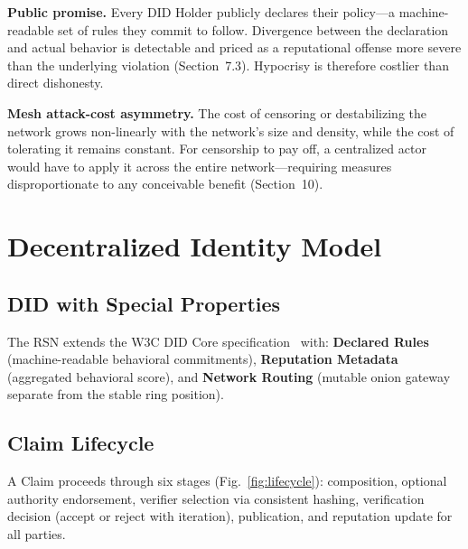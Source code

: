 \documentclass[11pt,a4paper,twocolumn]{article}
\begin{document}
\textbf{Public promise.} Every DID Holder publicly declares their policy---a machine-readable set of rules they commit to follow. Divergence between the declaration and actual behavior is detectable and priced as a reputational offense more severe than the underlying violation (Section~7.3). Hypocrisy is therefore costlier than direct dishonesty.

\textbf{Mesh attack-cost asymmetry.} The cost of censoring or destabilizing the network grows non-linearly with the network's size and density, while the cost of tolerating it remains constant. For censorship to pay off, a centralized actor would have to apply it across the entire network---requiring measures disproportionate to any conceivable benefit (Section~10).

\section{Decentralized Identity Model}

\subsection{DID with Special Properties}

The RSN extends the W3C DID Core specification~\cite{did2022} with: \textbf{Declared Rules} (machine-readable behavioral commitments), \textbf{Reputation Metadata} (aggregated behavioral score), and \textbf{Network Routing} (mutable onion gateway separate from the stable ring position).

\subsection{Claim Lifecycle}

A Claim proceeds through six stages (Fig.~\ref{fig:lifecycle}): composition, optional authority endorsement, verifier selection via consistent hashing, verification decision (accept or reject with iteration), publication, and reputation update for all parties.
\end{document}
